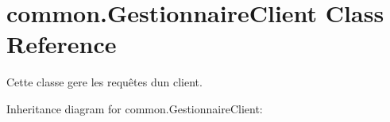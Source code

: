 \hypertarget{classcommon_1_1GestionnaireClient}{}\section{common.\+Gestionnaire\+Client Class Reference}
\label{classcommon_1_1GestionnaireClient}


Cette classe gere les requêtes d\textquotesingle{}un client.  




Inheritance diagram for common.\+Gestionnaire\+Client\+:
